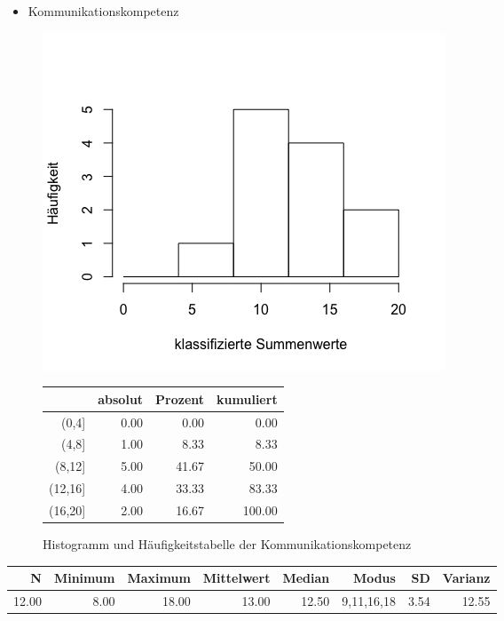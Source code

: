 \documentclass[12pt, bibliography=totoc]{scrartcl}
\begin{document}
\begin{itemize}
\tightlist
\item
  Kommunikationskompetenz
\end{itemize}

\begin{figure}[H]
\begin{minipage}{.5\linewidth}
\includegraphics[width=1.0\linewidth]{Anhang/KKHistn.png}

\label{pic:aufbau}
\end{minipage}
\begin{minipage}{.5\linewidth}
\centering
\raisebox{\depth}
{\begin{tabular}{rrrr}
  \hline
 & absolut & Prozent & kumuliert \\
  \hline
(0,4] & 0.00 & 0.00 & 0.00 \\
  (4,8] & 1.00 & 8.33 & 8.33 \\
  (8,12] & 5.00 & 41.67 & 50.00 \\
  (12,16] & 4.00 & 33.33 & 83.33 \\
  (16,20] & 2.00 & 16.67 & 100.00 \\
   \hline
\end{tabular}

}
\label{tab:defis}
\end{minipage}
\caption{Histogramm und Häufigkeitstabelle der Kommunikationskompetenz}
\end{figure}

\begin{table}[H]
\centering
\begin{tabular}{rrrrrrrr}
  \hline
  N & Minimum & Maximum & Mittelwert & Median & Modus & SD & Varianz \\
  \hline
 12.00 & 8.00 & 18.00 & 13.00 & 12.50 & 9,11,16,18 & 3.54 & 12.55 \\

\end{tabular}
\end{table}
\end{document}
